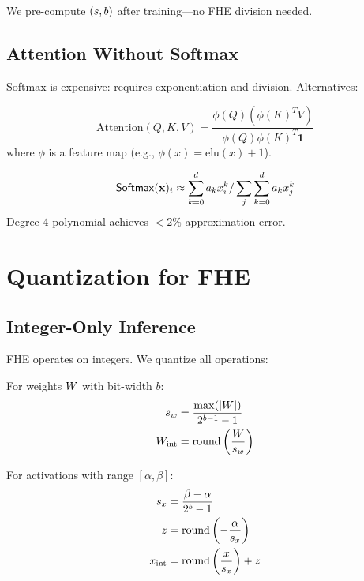 \documentclass{../shared/luxfhe}
\begin{document}
We pre-compute $(s, b)$ after training---no FHE division needed.

\subsection{Attention Without Softmax}

Softmax is expensive: requires exponentiation and division. Alternatives:

\begin{definition}
\[
\text{Attention}(Q, K, V) = \frac{\phi(Q)(\phi(K)^T V)}{\phi(Q)\phi(K)^T \mathbf{1}}
\]
where $\phi$ is a feature map (e.g., $\phi(x) = \text{elu}(x) + 1$).
\end{definition}

\begin{definition}
\[
\mathsf{Softmax}(\mathbf{x})_i \approx \sum_{k=0}^{d} a_k x_i^k / \sum_j \sum_{k=0}^{d} a_k x_j^k
\]
Degree-4 polynomial achieves $<2\%$ approximation error.
\end{definition}

\section{Quantization for FHE}

\subsection{Integer-Only Inference}

FHE operates on integers. We quantize all operations:

\begin{definition}
For weights $W$ with bit-width $b$:
\begin{align}
s_w &= \frac{\max(|W|)}{2^{b-1} - 1} \\
W_{\text{int}} &= \text{round}\left(\frac{W}{s_w}\right)
\end{align}
\end{definition}

\begin{definition}
For activations with range $[\alpha, \beta]$:
\begin{align}
s_x &= \frac{\beta - \alpha}{2^b - 1} \\
z &= \text{round}\left(-\frac{\alpha}{s_x}\right) \\
x_{\text{int}} &= \text{round}\left(\frac{x}{s_x}\right) + z
\end{align}
\end{definition}
\end{document}
